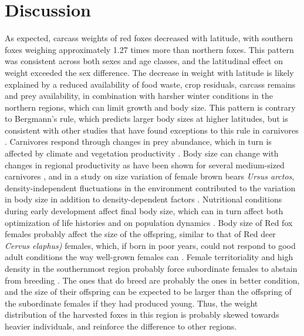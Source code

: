 \documentclass[12pt,a4paper,final,abstract=true,headings=small]{scrartcl}
\begin{document}
\section*{Discussion}

As expected, carcass weights of red foxes decreased with latitude, with southern foxes weighing approximately 1.27 times more than northern foxes. This pattern was consistent across both sexes and age classes, and the latitudinal effect on weight exceeded the sex difference. The decrease in weight with latitude is likely explained by a reduced availability of food waste, crop residuals, carcass remains and prey availability, in combination with harsher winter conditions in the northern regions, which can limit growth and body size. This pattern is contrary to Bergmann's rule, which predicts larger body sizes at higher latitudes, but is consistent with other studies that have found exceptions to this rule in carnivores \citep{frafjordRedFoxNorway1998,meiriGlobalChangeCarnivore2009a,yom-tovBodySizeRed2007}. Carnivores respond through changes in prey abundance, which in turn is affected by climate and vegetation productivity \citep{pettorelliNormalizedDifferenceVegetation2011}. Body size can change with changes in regional productivity as have been shown for several medium-sized carnivores \citep{yom-tovTemporalGeographicalVariation2013, wereszczukDifferentIncreaseRate2021}, and in a study on size variation of female brown bears \emph{Ursus arctos}, density-independent fluctuations in the environment contributed to the variation in body size in addition to density-dependent factors \citep{zedrosserPOPULATIONDENSITYFOOD2006}. Nutritional conditions during early development affect final body size, which can in turn affect both  optimization of life histories and on population dynamics \citep{lindstromEarlyDevelopmentFitness1999,bartonWinterSeverityLimits2007,reevesCaptivityinducedMetabolicProgramming2020}. Body size of Red fox females probably affect the size of the offspring, similar to that of Red deer \emph{Cervus elaphus)} females, which, if born in poor years, could not respond to good adult conditions the way well-grown females can \citep{nusseyConstraintsPlasticResponses2005, nusseyPhenotypicPlasticityMaternal2005}. Female territoriality and high density in the southernmost region probably force subordinate females to abstain from breeding \citep{macdonaldHelpersinFoxSociety1979,vonschantzNonBreedersRedFox1984a}. The ones that do breed are probably the ones in better condition, and the size of their offspring can be expected to be larger than the offspring of the subordinate females if they had produced young. Thus, the weight distribution of the harvested foxes in this region is probably skewed towards heavier individuals, and reinforce the difference to other regions.
\end{document}
